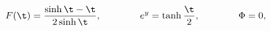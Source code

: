 \begin{equation}
F(\t)=\frac{\sinh \t -\t}{2 \sinh \t},\qquad \qquad
e^y= \tanh \frac{\t}{2}, \qquad \qquad \Phi=0,\qquad \\[2mm]
\end{equation}

